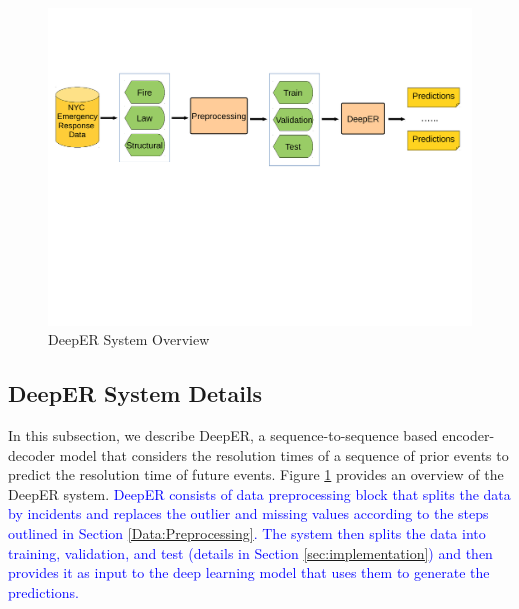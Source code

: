 \begin{figure}[!ht]
    \centering
       \includegraphics[trim=10 270 10 100,clip,scale = 0.37]{Figures/Model/preprocessing} %
       \caption{DeepER System Overview}
  \label{fig:system} 
  \vspace{-3mm}
\end{figure}



\subsection{DeepER System Details}

In this subsection, we describe DeepER, a sequence-to-sequence based encoder-decoder model that considers the resolution times of  a sequence of prior events to predict the resolution time of future events.   
Figure \ref{fig:system} provides an overview of the DeepER system. \textcolor{blue}{DeepER consists of data preprocessing block that splits the data by incidents and replaces  the outlier and missing values according to the steps outlined in Section \ref{Data:Preprocessing}. The system then splits the data into training, validation, and test (details in Section \ref{sec:implementation}) and then provides it as input to the deep learning model that uses them to generate the predictions.}



